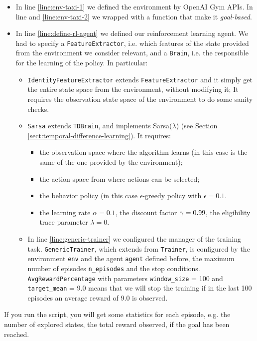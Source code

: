 \begin{itemize}
	\item In line \ref{line:env-taxi-1} we defined the environment by OpenAI Gym APIs. In line and \ref{line:env-taxi-2} we wrapped with a function that make it \emph{goal-based}.
	\item In line \ref{line:define-rl-agent} we defined our reinforcement learning agent. We had to specify a \texttt{FeatureExtractor}, i.e. which features of the state provided from the environment we consider relevant, and a \texttt{Brain}, i.e. the responsible for the learning of the policy. In particular:
	\begin{itemize}
		\item \texttt{IdentityFeatureExtractor} extends \texttt{FeatureExtractor} and it simply get the entire state space from the environment, without modifying it; It requires the observation state space of the environment to do some sanity checks. 
		\item \texttt{Sarsa} extends \texttt{TDBrain}, and implements Sarsa($\lambda$) (see Section \ref{sect:temporal-difference-learning}). It requires:
		\begin{itemize}
			\item the observation space where the algorithm learns (in this case is the same of the one provided by the environment);
			\item the action space from where actions can be selected;
			\item the behavior policy (in this case $\epsilon$-greedy policy with $\epsilon = 0.1$.
			\item the learning rate $\alpha=0.1$, the discount factor $\gamma=0.99$, the eligibility trace parameter $\lambda = 0$.
		\end{itemize}
		\item In line \ref{line:generic-trainer} we configured the manager of the training task. \texttt{GenericTrainer}, which extends from \texttt{Trainer}, is configured by the environment \texttt{env} and the agent \texttt{agent} defined before, the maximum number of episodes \texttt{n\_episodes} and the stop conditions. \texttt{AvgRewardPercentage} with parameters \texttt{window\_size} = 100 and \texttt{target\_mean} = 9.0 means that we will stop the training if in the last 100 episodes an average reward of 9.0 is observed.
	\end{itemize}
\end{itemize}

If you run the script, you will get some statistics for each episode, e.g. the number of explored states, the total reward observed, if the goal has been reached.

